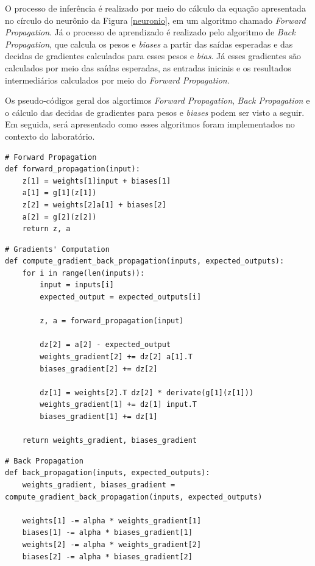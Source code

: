 \documentclass[conference]{IEEEtran}
\begin{document}
O processo de inferência é realizado por meio do cálculo da equação apresentada no círculo do neurônio da Figura \ref{neuronio}, em um algoritmo chamado \textit{Forward Propagation}. Já o processo de aprendizado é realizado pelo algoritmo de \textit{Back Propagation}, que calcula os pesos e \textit{biases} a partir das saídas esperadas e das decidas de gradientes calculados para esses pesos e \textit{bias}. Já esses gradientes são calculados por meio das saídas esperadas, as entradas iniciais e os resultados intermediários calculados por meio do \textit{Forward Propagation}. 

Os pseudo-códigos geral dos algortimos \textit{Forward Propagation}, \textit{Back Propagation} e o cálculo das decidas de gradientes para pesos e \textit{biases} podem ser visto a seguir. Em seguida, será apresentado como esses algoritmos foram implementados no contexto do laboratório.

\begin{lstlisting}
# Forward Propagation
def forward_propagation(input):
	z[1] = weights[1]input + biases[1]
	a[1] = g[1](z[1])
	z[2] = weights[2]a[1] + biases[2]
	a[2] = g[2](z[2])
	return z, a
\end{lstlisting}

\begin{lstlisting}
# Gradients' Computation
def compute_gradient_back_propagation(inputs, expected_outputs):
	for i in range(len(inputs)):
		input = inputs[i]
		expected_output = expected_outputs[i]
		
		z, a = forward_propagation(input)

		dz[2] = a[2] - expected_output
		weights_gradient[2] += dz[2] a[1].T
		biases_gradient[2] += dz[2]

		dz[1] = weights[2].T dz[2] * derivate(g[1](z[1]))
		weights_gradient[1] += dz[1] input.T
		biases_gradient[1] += dz[1]

	return weights_gradient, biases_gradient
\end{lstlisting}

\begin{lstlisting}
# Back Propagation
def back_propagation(inputs, expected_outputs):
	weights_gradient, biases_gradient = compute_gradient_back_propagation(inputs, expected_outputs)

	weights[1] -= alpha * weights_gradient[1]
	biases[1] -= alpha * biases_gradient[1]
	weights[2] -= alpha * weights_gradient[2]
	biases[2] -= alpha * biases_gradient[2]
\end{lstlisting}
\end{document}

